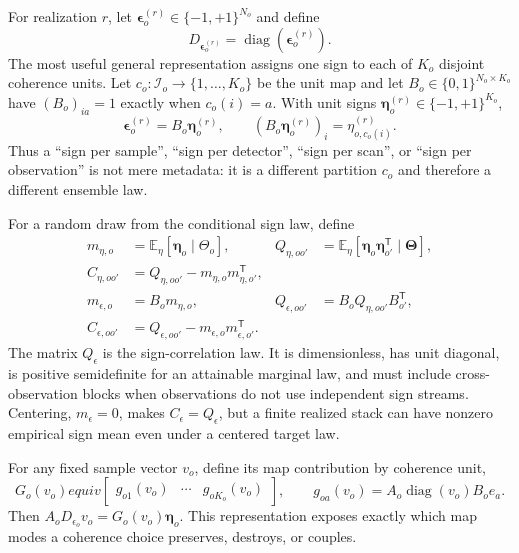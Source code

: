 \documentclass[11pt]{article}
\newcommand{\E}{\mathbb{E}}
\newcommand{\diag}{\operatorname{diag}}
\newcommand{\eps}{\boldsymbol{\epsilon}}
\newcommand{\etaV}{\boldsymbol{\eta}}
\newcommand{\ThetaV}{\boldsymbol{\Theta}}
\begin{document}
For realization $r$, let $\eps_o^{(r)}\in\{-1,+1\}^{N_o}$ and define
\begin{equation}
  D_{\eps_o^{(r)}}=\diag\!\left(\eps_o^{(r)}\right).
  \label{eq:sign-operator}
\end{equation}
The most useful general representation assigns one sign to each of $K_o$
disjoint coherence units.  Let
$c_o:\mathcal I_o\rightarrow\{1,\ldots,K_o\}$ be the unit map and let
$B_o\in\{0,1\}^{N_o\times K_o}$ have
$(B_o)_{ia}=1$ exactly when $c_o(i)=a$.  With unit signs
$\etaV_o^{(r)}\in\{-1,+1\}^{K_o}$,
\begin{equation}
  \eps_o^{(r)}=B_o\etaV_o^{(r)},
  \qquad
  (B_o\etaV_o^{(r)})_i=\eta_{o,c_o(i)}^{(r)}.
  \label{eq:coherence-lift}
\end{equation}
Thus a ``sign per sample'', ``sign per detector'', ``sign per scan'', or
``sign per observation'' is not mere metadata: it is a different partition
$c_o$ and therefore a different ensemble law.

For a random draw from the conditional sign law, define
\begin{align}
  m_{\eta,o} &= \E_{\eta}[\etaV_o\mid\Theta_o], &
  Q_{\eta,oo'} &= \E_{\eta}[\etaV_o\etaV_{o'}^{\mathsf T}
      \mid\ThetaV],
  \label{eq:unit-sign-moments}\\
  C_{\eta,oo'} &= Q_{\eta,oo'}-m_{\eta,o}m_{\eta,o'}^{\mathsf T},
  \label{eq:unit-sign-covariance}\\
  m_{\epsilon,o} &= B_o m_{\eta,o}, &
  Q_{\epsilon,oo'} &= B_oQ_{\eta,oo'}B_{o'}^{\mathsf T},
  \label{eq:sample-sign-moments}\\
  C_{\epsilon,oo'} &=Q_{\epsilon,oo'}
    -m_{\epsilon,o}m_{\epsilon,o'}^{\mathsf T}.
  \label{eq:sample-sign-covariance}
\end{align}
The matrix $Q_\epsilon$ is the sign-correlation law.  It is dimensionless,
has unit diagonal, is positive semidefinite for an attainable marginal law,
and must include cross-observation blocks when observations do not use
independent sign streams.  Centering, $m_\epsilon=0$, makes
$C_\epsilon=Q_\epsilon$, but a finite realized stack can have nonzero empirical
sign mean even under a centered target law.

For any fixed sample vector $v_o$, define its map contribution by coherence
unit,
\begin{equation}
  G_o(v_o)equiv
  \begin{bmatrix}g_{o1}(v_o)&\cdots&g_{oK_o}(v_o)\end{bmatrix},
  \qquad
  g_{oa}(v_o)=A_o\diag(v_o)B_oe_a .
  \label{eq:unit-map-contributions}
\end{equation}
Then $A_oD_{\epsilon_o}v_o=G_o(v_o)\etaV_o$.  This representation exposes
exactly which map modes a coherence choice preserves, destroys, or couples.
\end{document}
